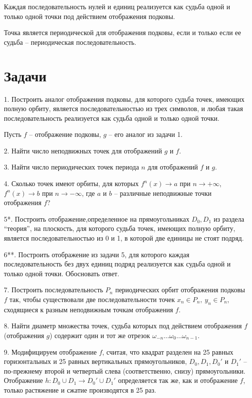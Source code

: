 \documentclass[a4paper]{article}
\begin{document}
\begin{proclaim}[Теорема 2] Каждая последовательность нулей и единиц
реализуется как судьба одной и только одной точки под действием
отображения подковы.

\begin{proclaim}[Теорема 3] Точка является периодической для отображения
подковы, если и только если ее судьба -- периодическая
последовательность.
\end{proclaim}

\section{Задачи}

1. Построить аналог отображения подковы, для которого судьба
точек, имеющих полную орбиту,
 является последовательностью из трех символов, и любая такая последовательность
реализуется как судьба одной и только одной точки.

Пусть $f$ -- отображение подковы, $g$ -- его аналог из задачи 1.

2.  Найти число неподвижных точек для отображений $g$ и $f$.

3. Найти число периодических точек периода $n$ для отображений $f$
и $g$.

4. Сколько точек имеют орбиты, для которых $f^n(x)\to a$ при $n\to
+\infty$, $f^n(x)\to b$ при $n\to -\infty$, где $a$ и $b$ --
различные неподвижные точки отображения $f$?

5*. Построить отображение,определенное на прямоугольниках $ D_0,
D_1 $ из раздела ``теория'', на плоскость, для которого судьба
точек, имеющих полную орбиту, является последовательностью из 0 и
1, в которой две единицы не стоят подряд.

6**.  Построить отображение из задачи 5, для которого каждая
последовательность без двух единиц подряд реализуется как судьба
одной и только одной точки. Обосновать ответ.

7. Построить последовательность $P_n$ периодических орбит
отображения подковы $f$ так, чтобы существовали две
последовательности точек $x_n\in P_n,\ y_n\in P_n$, сходящиеся к
разным неподвижным точкам отображения $f$.

8. Найти диаметр множества точек, судьба которых под действием
отображения $f$ (отображения $g$) содержит один и тот же отрезок
$\omega_{-n}\ldots \omega_0\ldots \omega_{n-1}$.

9. Модифицируем отображение $f$, считая, что  квадрат разделен на
25 равных горизонтальных и 25 равных вертикальных прямоугольников,
$D_0, D_1, D_0'$ и $D_1'$ -- по-прежнему второй и четвертый слева
(соответственно, снизу) прямоугольники. Отображение $h:D_0\cup
D_1\to D_0'\cup D_1'$ определяется так же, как и отображение $f$,
только растяжение и сжатие производятся в 25 раз.


\end{proclaim}
\end{document}
